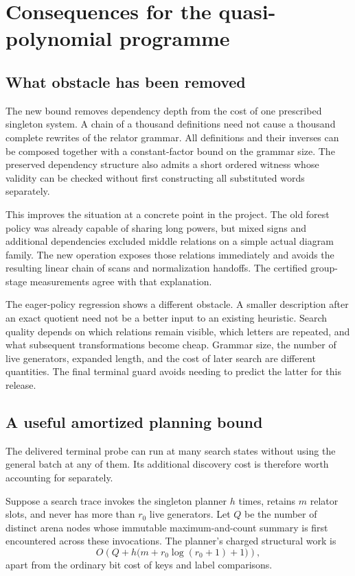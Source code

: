 \section{Consequences for the quasi-polynomial programme}
\label{sec:research}

\subsection{What obstacle has been removed}

The new bound removes dependency depth from the cost of one prescribed
singleton system. A chain of a thousand definitions need not cause a
thousand complete rewrites of the relator grammar. All definitions and
their inverses can be composed together with a constant-factor bound on
the grammar size. The preserved dependency structure also admits a short
ordered witness whose validity can be checked without first constructing
all substituted words separately.

This improves the situation at a concrete point in the project. The old
forest policy was already capable of sharing long powers, but mixed signs
and additional dependencies excluded middle relations on a simple actual
diagram family. The new operation exposes those relations immediately and
avoids the resulting linear chain of scans and normalization handoffs.
The certified group-stage measurements agree with that explanation.

The eager-policy regression shows a different obstacle. A smaller
description after an exact quotient need not be a better input to an
existing heuristic. Search quality depends on which relations remain
visible, which letters are repeated, and what subsequent transformations
become cheap. Grammar size, the number of live generators, expanded length,
and the cost of later search are different quantities. The final terminal
guard avoids needing to predict the latter for this release.

\subsection{A useful amortized planning bound}

The delivered terminal probe can run at many search states without using
the general batch at any of them. Its additional discovery cost is therefore
worth accounting for separately.

\begin{proposition}
\label{prop:amortized-planning}
Suppose a search trace invokes the singleton planner $h$ times, retains
$m$ relator slots, and never has more than $r_0$ live generators. Let $Q$
be the number of distinct arena nodes whose immutable maximum-and-count
summary is first encountered across these invocations. The planner's
charged structural work is
\[
 O\!\left(Q+h\bigl(m+r_0\log(r_0+1)+1\bigr)\right),
\]
apart from the ordinary bit cost of keys and label comparisons.
\end{proposition}


